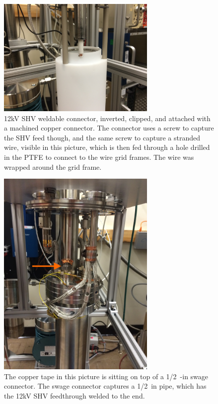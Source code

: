 \begin{figure}[htbp]
\begin{center}
\includegraphics[width=3in]{figures/testbed/ft1_1.jpg}
\caption{12kV SHV weldable connector, inverted, clipped, and attached with a machined copper connector. The connector uses a screw to capture the SHV feed though, and the same screw to capture a stranded wire, visible in this picture, which is then fed through a hole drilled in the PTFE to connect to the wire grid frames. The wire was wrapped around the grid frame.}
\label{fig:ft1_1}
\end{center}
\end{figure}

\begin{figure}[htbp]
\begin{center}
\includegraphics[width=3in]{figures/testbed/ft1_2.jpg}
\caption{The copper tape in this picture is sitting on top of a 1/2~-in swage connector. The swage connector captures a 1/2~in pipe, which has the 12kV SHV feedthrough welded to the end.}
\label{fig:ft1_2}
\end{center}
\end{figure}

